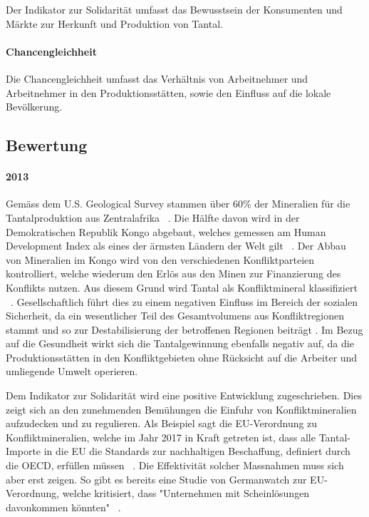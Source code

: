 Der Indikator zur Solidarität umfasst das Bewusstsein der Konsumenten und
Märkte zur Herkunft und Produktion von Tantal.

\paragraph{Chancengleichheit}

Die Chancengleichheit umfasst das Verhältnis von Arbeitnehmer und
Arbeitnehmer in den Produktionsstätten, sowie den Einfluss auf die lokale
Bevölkerung.

\subsection{Bewertung}

\paragraph{2013} Gemäss dem U.S. Geological Survey stammen über 60\% der Mineralien für die
Tantalproduktion aus Zentralafrika ~\cite{USGSMine8}. Die Hälfte davon
wird in der Demokratischen Republik Kongo abgebaut, welches gemessen am Human Development Index als eines der ärmsten
Ländern der Welt gilt ~\cite{UNDProgramme2018}. Der Abbau von Mineralien im
Kongo wird von den verschiedenen Konfliktparteien kontrolliert, welche wiederum
den Erlös aus den Minen zur Finanzierung des Konflikts nutzen. Aus diesem Grund
wird Tantal als Konfliktmineral klassifiziert ~\cite{doevenspeck2012konfliktmineralien}.
Gesellschaftlich führt dies zu einem negativen Einfluss im Bereich der sozialen
Sicherheit, da ein wesentlicher Teil des Gesamtvolumens aus Konfliktregionen
stammt und so zur Destabilisierung der betroffenen Regionen beiträgt \cite{Thespoil65}. 
Im Bezug auf die Gesundheit wirkt sich die Tantalgewinnung ebenfalls negativ auf, da die 
Produktionsstätten in den Konfliktgebieten ohne Rücksicht auf die Arbeiter und umliegende Umwelt
operieren.

Dem Indikator zur Solidarität wird eine positive Entwicklung zugeschrieben.
Dies zeigt sich an den zunehmenden Bemühungen die Einfuhr von Konfliktmineralien 
aufzudecken und zu regulieren. Als Beispiel sagt die EU-Verordnung zu Konfliktmineralien, 
welche im Jahr 2017 in Kraft getreten ist, dass alle Tantal-Importe in die EU die Standards zur nachhaltigen Beschaffung, 
definiert durch die OECD, erfüllen müssen ~\cite{europeancommission}. Die Effektivität solcher 
Massnahmen muss sich aber erst zeigen. So gibt es bereits eine Studie von Germanwatch zur EU-Verordnung, 
welche kritisiert, dass "Unternehmen mit Scheinlösungen davonkommen könnten" ~\cite{Governan35}.

